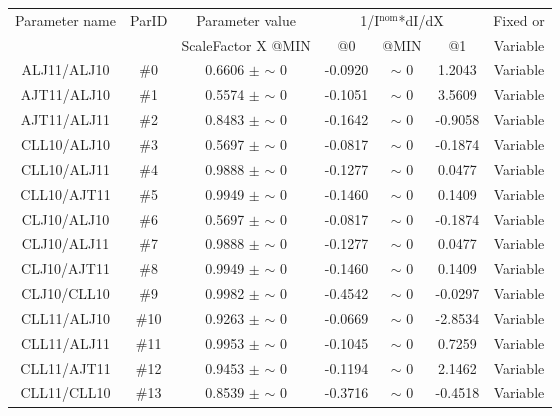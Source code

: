\begin{table}[H]
\scriptsize
\begin{center}
\renewcommand{\arraystretch}{1.1}
\begin{tabular}{|c|c|c|ccc|c|}
\hline
Parameter name & ParID & Parameter value &\multicolumn{3}{|c|}{1/I$^\mathrm{nom}$*dI/dX} & Fixed or\\
 & & ScaleFactor X @MIN & @0 & @MIN & @1 & Variable\\
\hline
 {\tiny ALJ11/ALJ10} & \#0 &    0.6606 $\pm$ {\tiny $\sim$ }0 &   -0.0920 & {\tiny $\sim$ }0 &    1.2043 & Variable \\
 {\tiny AJT11/ALJ10} & \#1 &    0.5574 $\pm$ {\tiny $\sim$ }0 &   -0.1051 & {\tiny $\sim$ }0 &    3.5609 & Variable \\
 {\tiny AJT11/ALJ11} & \#2 &    0.8483 $\pm$ {\tiny $\sim$ }0 &   -0.1642 & {\tiny $\sim$ }0 &   -0.9058 & Variable \\
 {\tiny CLL10/ALJ10} & \#3 &    0.5697 $\pm$ {\tiny $\sim$ }0 &   -0.0817 & {\tiny $\sim$ }0 &   -0.1874 & Variable \\
 {\tiny CLL10/ALJ11} & \#4 &    0.9888 $\pm$ {\tiny $\sim$ }0 &   -0.1277 & {\tiny $\sim$ }0 &    0.0477 & Variable \\
 {\tiny CLL10/AJT11} & \#5 &    0.9949 $\pm$ {\tiny $\sim$ }0 &   -0.1460 & {\tiny $\sim$ }0 &    0.1409 & Variable \\
 {\tiny CLJ10/ALJ10} & \#6 &    0.5697 $\pm$ {\tiny $\sim$ }0 &   -0.0817 & {\tiny $\sim$ }0 &   -0.1874 & Variable \\
 {\tiny CLJ10/ALJ11} & \#7 &    0.9888 $\pm$ {\tiny $\sim$ }0 &   -0.1277 & {\tiny $\sim$ }0 &    0.0477 & Variable \\
 {\tiny CLJ10/AJT11} & \#8 &    0.9949 $\pm$ {\tiny $\sim$ }0 &   -0.1460 & {\tiny $\sim$ }0 &    0.1409 & Variable \\
 {\tiny CLJ10/CLL10} & \#9 &    0.9982 $\pm$ {\tiny $\sim$ }0 &   -0.4542 & {\tiny $\sim$ }0 &   -0.0297 & Variable \\
 {\tiny CLL11/ALJ10} & \#10 &    0.9263 $\pm$ {\tiny $\sim$ }0 &   -0.0669 & {\tiny $\sim$ }0 &   -2.8534 & Variable \\
 {\tiny CLL11/ALJ11} & \#11 &    0.9953 $\pm$ {\tiny $\sim$ }0 &   -0.1045 & {\tiny $\sim$ }0 &    0.7259 & Variable \\
 {\tiny CLL11/AJT11} & \#12 &    0.9453 $\pm$ {\tiny $\sim$ }0 &   -0.1194 & {\tiny $\sim$ }0 &    2.1462 & Variable \\
 {\tiny CLL11/CLL10} & \#13 &    0.8539 $\pm$ {\tiny $\sim$ }0 &   -0.3716 & {\tiny $\sim$ }0 &   -0.4518 & Variable \\

\end{tabular}
\end{center}
\end{table}

